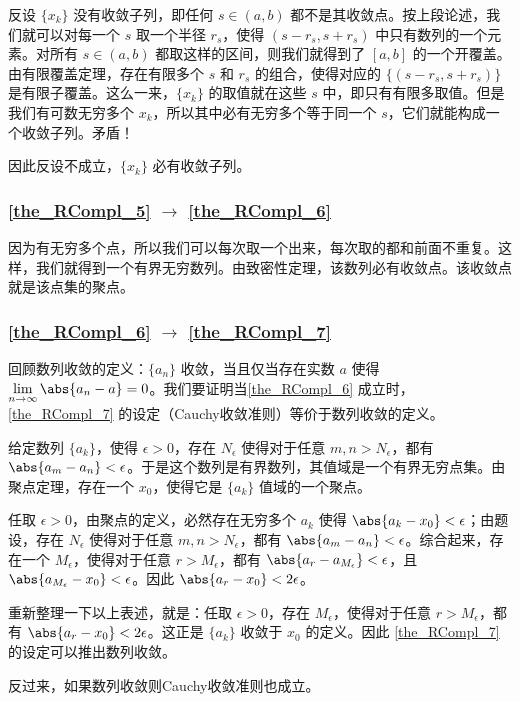 反设 $\{x_k\}$ 没有收敛子列，即任何 $s\in(a, b)$ 都不是其收敛点。按上段论述，我们就可以对每一个 $s$ 取一个半径 $r_s$，使得 $(s-r_s, s+r_s)$ 中只有数列的一个元素。对所有 $s\in(a, b)$ 都取这样的区间，则我们就得到了 $[a, b]$ 的一个开覆盖。由有限覆盖定理，存在有限多个 $s$ 和 $r_s$ 的组合，使得对应的 $\{(s-r_s, s+r_s)\}$ 是有限子覆盖。这么一来，$\{x_k\}$ 的取值就在这些 $s$ 中，即只有有限多取值。但是我们有可数无穷多个 $x_k$，所以其中必有无穷多个等于同一个 $s$，它们就能构成一个收敛子列。矛盾！

因此反设不成立，$\{x_k\}$ 必有收敛子列。

\subsubsection{\autoref{the_RCompl_5} $\to$ \autoref{the_RCompl_6} }

因为有无穷多个点，所以我们可以每次取一个出来，每次取的都和前面不重复。这样，我们就得到一个有界无穷数列。由致密性定理，该数列必有收敛点。该收敛点就是该点集的聚点。



\subsubsection{\autoref{the_RCompl_6} $\to$ \autoref{the_RCompl_7} }

回顾数列收敛的定义：$\{a_n\}$ 收敛，当且仅当存在实数 $a$ 使得 $\lim\limits_{n\to \infty}\abs{a_n-a}=0$。我们要证明当\autoref{the_RCompl_6} 成立时， \autoref{the_RCompl_7} 的设定（Cauchy收敛准则）等价于数列收敛的定义。

给定数列 $\{a_k\}$，使得 $\epsilon>0$，存在 $N_\epsilon$ 使得对于任意 $m, n>N_\epsilon$，都有 $\abs{a_m-a_n}<\epsilon$。于是这个数列是有界数列，其值域是一个有界无穷点集。由聚点定理，存在一个 $x_0$，使得它是 $\{a_k\}$ 值域的一个聚点。

任取 $\epsilon>0$，由聚点的定义，必然存在无穷多个 $a_k$ 使得 $\abs{a_k-x_0}<\epsilon$；由题设，存在 $N_\epsilon$ 使得对于任意 $m, n>N_\epsilon$，都有 $\abs{a_m-a_n}<\epsilon$。综合起来，存在一个 $M_\epsilon$，使得对于任意 $r>M_\epsilon$，都有 $\abs{a_r-a_{M_\epsilon}}<\epsilon$，且 $\abs{a_{M_\epsilon}-x_0}<\epsilon$。因此 $\abs{a_r-x_0}<2\epsilon$。

重新整理一下以上表述，就是：任取 $\epsilon>0$，存在 $M_\epsilon$，使得对于任意 $r>M_\epsilon$，都有 $\abs{a_r-x_0}<2\epsilon$。这正是 $\{a_k\}$ 收敛于 $x_0$ 的定义。因此 \autoref{the_RCompl_7} 的设定可以推出数列收敛。

反过来，如果数列收敛则Cauchy收敛准则也成立。


